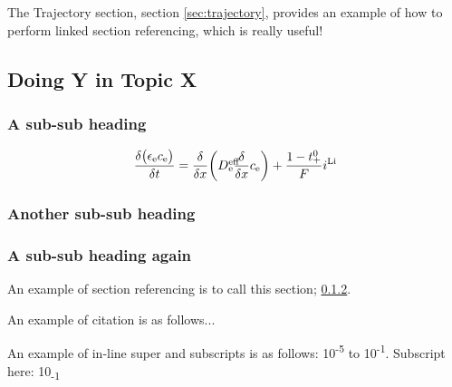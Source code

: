 \documentclass[pdftex,12pt,a4paper]{article}
\def\SPSB#1#2{\rlap{\textsuperscript{\textcolor{black}{#1}}}\SB{#2}}
\def\SB#1{\textsubscript{\textcolor{black}{#1}}}
\begin{document}
The Trajectory section, section \ref{sec:trajectory}, provides an example of how to perform linked section referencing, which is really useful! \\	%

\subsection{Doing Y in Topic X} \label{sec:doing Y}

\subsubsection{A sub-sub heading} \label{sec:short name for this section}
\blindtext		%

\begin{equation}\label{eq:species_cons_elec_phase}
	\frac{\delta\big(\epsilon\textsubscript{e}c\textsubscript{e}\big)}{\delta t} = \frac{\delta}{\delta x}\bigg(D\SPSB{eff}{e}\frac{\delta}{\delta x}c\textsubscript{e}\bigg)+\frac{1-t\SPSB{0}{+}}{F}i\textsuperscript{Li}
	\end{equation}

\blindtext		%

\subsubsection{Another sub-sub heading} \label{sec:short name for this section, 2}
\blindtext		%

\subsubsection{A sub-sub heading again} \label{sec:short name for this section, 3}
\blindtext		%

An example of section referencing is to call this section; \ref{sec:short name for this section, 2}. 

An example of citation is as follows... \cite{Goodenough2013a}

An example of in-line super and subscripts is as follows: 10\textsuperscript{-5} to 10\textsuperscript{-1}. Subscript here: 10\textsubscript{-1}
\end{document}
